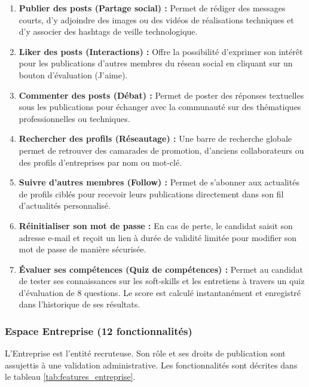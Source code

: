 \begin{enumerate}
    \item \textbf{Publier des posts (Partage social) :} Permet de rédiger des messages courts, d'y adjoindre des images ou des vidéos de réalisations techniques et d'y associer des hashtags de veille technologique.
    \item \textbf{Liker des posts (Interactions) :} Offre la possibilité d'exprimer son intérêt pour les publications d'autres membres du réseau social en cliquant sur un bouton d'évaluation (J'aime).
    \item \textbf{Commenter des posts (Débat) :} Permet de poster des réponses textuelles sous les publications pour échanger avec la communauté sur des thématiques professionnelles ou techniques.
    \item \textbf{Rechercher des profils (Réseautage) :} Une barre de recherche globale permet de retrouver des camarades de promotion, d'anciens collaborateurs ou des profils d'entreprises par nom ou mot-clé.
    \item \textbf{Suivre d'autres membres (Follow) :} Permet de s'abonner aux actualités de profils ciblés pour recevoir leurs publications directement dans son fil d'actualités personnalisé.
    \item \textbf{Réinitialiser son mot de passe :} En cas de perte, le candidat saisit son adresse e-mail et reçoit un lien à durée de validité limitée pour modifier son mot de passe de manière sécurisée.
    \item \textbf{Évaluer ses compétences (Quiz de compétences) :} Permet au candidat de tester ses connaissances sur les soft-skills et les entretiens à travers un quiz d'évaluation de 8 questions. Le score est calculé instantanément et enregistré dans l'historique de ses résultats.
\end{enumerate}

\subsubsection{Espace Entreprise (12 fonctionnalités)}
L'Entreprise est l'entité recruteuse. Son rôle et ses droits de publication sont assujettis à une validation administrative. Les fonctionnalités sont décrites dans le tableau \ref{tab:features_entreprise}.

